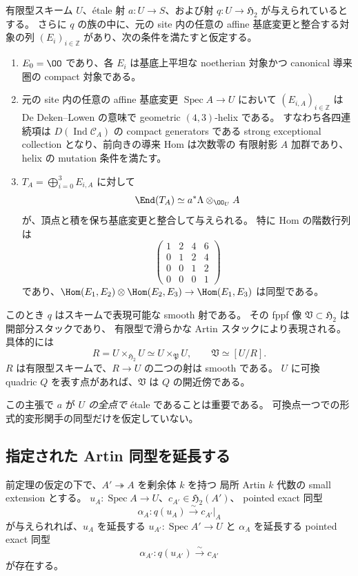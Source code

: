 \begin{theorem}
\label{thm:atlas-from-effective-foundation}
有限型スキーム $U$、\'etale 射 $a:U\to S$、および射
$q:U\to\mathfrak H_2$ が与えられているとする。
さらに $q$ の族の中に、元の site 内の任意の affine 基底変更と整合する対象の列
$(E_i)_{i\in\mathbb Z}$ があり、次の条件を満たすと仮定する。
\begin{enumerate}
 \item $E_0=\OO$ であり、各 $E_i$ は基底上平坦な noetherian 対象かつ
 canonical 導来圏の compact 対象である。
 \item 元の site 内の任意の affine 基底変更 $\operatorname{Spec} A\to U$ において
 $(E_{i,A})_{i\in\mathbb Z}$ は De Deken--Lowen の意味で geometric $(4,3)$-helix である。
 すなわち各四連続項は $D(\operatorname{Ind}\mathcal C_A)$ の compact generators である
 strong exceptional collection となり、前向きの導来 Hom は次数零の
 有限射影 $A$ 加群であり、helix の mutation 条件を満たす。
 \item $T_A=\bigoplus_{i=0}^3E_{i,A}$ に対して
 \[
  \End(T_A)\simeq a^*\Lambda\otimes_{\OO_U}A
 \]
 が、頂点と積を保ち基底変更と整合して与えられる。
 特に Hom の階数行列は
 \[
 \begin{pmatrix}
 1&2&4&6\\0&1&2&4\\0&0&1&2\\0&0&0&1
 \end{pmatrix}
 \]
 であり、$\Hom(E_1,E_2)\otimes\Hom(E_2,E_3)\to\Hom(E_1,E_3)$ は同型である。
\end{enumerate}
このとき $q$ はスキームで表現可能な smooth 射である。
その fppf 像 $\mathfrak V\subset\mathfrak H_2$ は開部分スタックであり、
有限型で滑らかな Artin スタックにより表現される。
具体的には
\[
 R=U\times_{\mathfrak H_2}U
   \simeq U\times_{\mathfrak P}U,
 \qquad
 \mathfrak V\simeq[U/R].
\]
$R$ は有限型スキームで、$R\to U$ の二つの射は smooth である。
$U$ に可換 quadric $Q$ を表す点があれば、$\mathfrak V$ は $Q$ の開近傍である。
\end{theorem}

この主張で $a$ が \emph{$U$ の全点で} \'etale であることは重要である。
可換点一つでの形式的変形関手の同型だけを仮定していない。

\subsection{指定された Artin 同型を延長する}

\begin{lemma}
\label{lem:atlas-artin-lift}
前定理の仮定の下で、$A'\twoheadrightarrow A$ を剰余体 $k$ を持つ
局所 Artin $k$ 代数の small extension とする。
$u_A:\operatorname{Spec} A\to U$、$c_{A'}\in\mathfrak H_2(A')$、
pointed exact 同型
\[
 \alpha_A:q(u_A)\xrightarrow{\sim}c_{A'}|_A
\]
が与えられれば、$u_A$ を延長する $u_{A'}:\operatorname{Spec} A'\to U$ と
$\alpha_A$ を延長する pointed exact 同型
\[
 \alpha_{A'}:q(u_{A'})\xrightarrow{\sim}c_{A'}
\]
が存在する。
\end{lemma}

